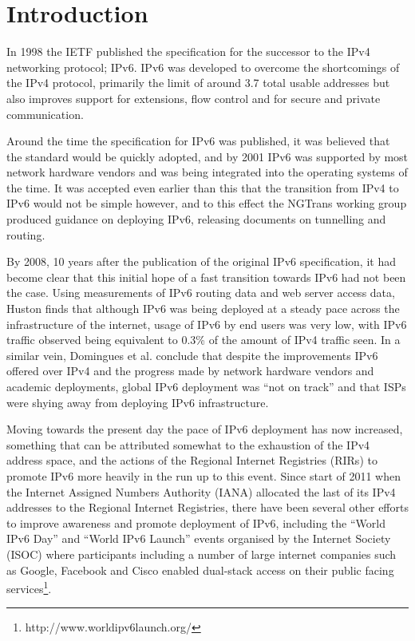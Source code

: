 \section{Introduction}

In 1998 the IETF published the specification for the successor to the IPv4
networking protocol; IPv6. IPv6 was developed to overcome the shortcomings
of the IPv4 protocol, primarily the limit of around 3.7 total usable
addresses\cite{beijnum_ip_2013} but also improves support for extensions, flow
control and for secure and private communication\cite{rfc2460}.

Around the time the specification for IPv6 was published, it was believed that
the standard would be quickly adopted, and by 2001 IPv6 was supported by most
network hardware vendors and was being integrated into the operating systems of
the time\cite{huang_ipv6_2000}\cite{durand_deploying_2001}. It was accepted even
earlier than this that
the transition from IPv4 to IPv6 would not be simple however, and to this effect
the NGTrans working group produced guidance on deploying IPv6, releasing
documents on tunnelling\cite{rfc1933}\cite{rfc2893} and routing\cite{rfc2185}. 

By 2008, 10 years after the publication of the original IPv6
specification, it had become clear that this initial hope of a fast
transition towards IPv6 had not been the case. Using measurements of IPv6 routing
data and web server access data, Huston finds that although IPv6 was being
deployed at a steady pace across the infrastructure of the internet, usage of
IPv6 by end users was very low, with IPv6 traffic observed being equivalent to
0.3\% of the amount of IPv4 traffic seen\cite{huston_ipv6_2008}. In a similar vein, Domingues 
et al. conclude that despite the improvements IPv6 offered over IPv4
and the progress made by network hardware vendors and academic deployments,
global IPv6 deployment was ``not on track'' and that ISPs were shying away from
deploying IPv6 infrastructure\cite{domingues_is_2007}.

Moving towards the present day the pace of IPv6 deployment has now increased,
something that can be attributed somewhat to the exhaustion of the IPv4 address
space, and the actions of the Regional Internet Registries (RIRs) to promote IPv6 more heavily in the run up to
this event. Since start of 2011 when the Internet Assigned Numbers Authority (IANA)
allocated the last of its IPv4 addresses to the Regional Internet
Registries\cite{number_resource_organisation_free_2011},
there have been several other efforts to improve awareness and promote
deployment of IPv6, including the ``World IPv6 Day'' and ``World IPv6 Launch''
events organised by the Internet Society (ISOC) where participants including a
number of large internet companies such as Google, Facebook and Cisco enabled
dual-stack access on their public facing services\footnote[1]{http://www.worldipv6launch.org/}.

